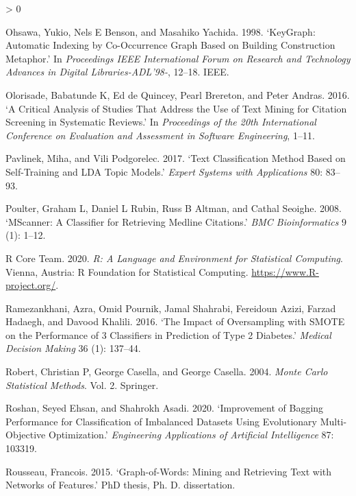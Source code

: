 \documentclass{article}
\newlength{\cslhangindent}
\newenvironment{CSLReferences}[2] %
 {%
  \setlength{\parindent}{0pt}
  \ifodd #1 \everypar{\setlength{\hangindent}{\cslhangindent}}\ignorespaces\fi
  \ifnum #2 > 0
  \setlength{\parskip}{#2\baselineskip}
  \fi
 }%
 {}
\begin{document}
\begin{CSLReferences}{1}{0}
\leavevmode\hypertarget{ref-ohsawa1998keygraph}{}%
Ohsawa, Yukio, Nels E Benson, and Masahiko Yachida. 1998. {`KeyGraph:
Automatic Indexing by Co-Occurrence Graph Based on Building Construction
Metaphor.'} In \emph{Proceedings IEEE International Forum on Research
and Technology Advances in Digital Libraries-ADL'98-}, 12--18. IEEE.

\leavevmode\hypertarget{ref-olorisade2016critical}{}%
Olorisade, Babatunde K, Ed de Quincey, Pearl Brereton, and Peter Andras.
2016. {`A Critical Analysis of Studies That Address the Use of Text
Mining for Citation Screening in Systematic Reviews.'} In
\emph{Proceedings of the 20th International Conference on Evaluation and
Assessment in Software Engineering}, 1--11.

\leavevmode\hypertarget{ref-pavlinek2017text}{}%
Pavlinek, Miha, and Vili Podgorelec. 2017. {`Text Classification Method
Based on Self-Training and LDA Topic Models.'} \emph{Expert Systems with
Applications} 80: 83--93.

\leavevmode\hypertarget{ref-poulter2008mscanner}{}%
Poulter, Graham L, Daniel L Rubin, Russ B Altman, and Cathal Seoighe.
2008. {`MScanner: A Classifier for Retrieving Medline Citations.'}
\emph{BMC Bioinformatics} 9 (1): 1--12.

\leavevmode\hypertarget{ref-rstat}{}%
R Core Team. 2020. \emph{R: A Language and Environment for Statistical
Computing}. Vienna, Austria: R Foundation for Statistical Computing.
\url{https://www.R-project.org/}.

\leavevmode\hypertarget{ref-ramezankhani2016impact}{}%
Ramezankhani, Azra, Omid Pournik, Jamal Shahrabi, Fereidoun Azizi,
Farzad Hadaegh, and Davood Khalili. 2016. {`The Impact of Oversampling
with SMOTE on the Performance of 3 Classifiers in Prediction of Type 2
Diabetes.'} \emph{Medical Decision Making} 36 (1): 137--44.

\leavevmode\hypertarget{ref-robert2004monte}{}%
Robert, Christian P, George Casella, and George Casella. 2004.
\emph{Monte Carlo Statistical Methods}. Vol. 2. Springer.

\leavevmode\hypertarget{ref-roshan2020improvement}{}%
Roshan, Seyed Ehsan, and Shahrokh Asadi. 2020. {`Improvement of Bagging
Performance for Classification of Imbalanced Datasets Using Evolutionary
Multi-Objective Optimization.'} \emph{Engineering Applications of
Artificial Intelligence} 87: 103319.

\leavevmode\hypertarget{ref-rousseau2015graph}{}%
Rousseau, Francois. 2015. {`Graph-of-Words: Mining and Retrieving Text
with Networks of Features.'} PhD thesis, Ph. D. dissertation.


\end{CSLReferences}
\end{document}

